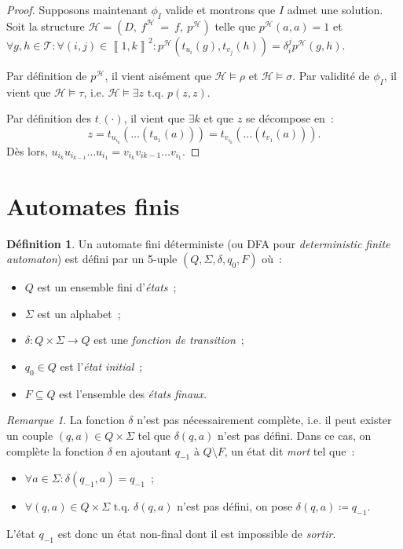 \documentclass{article}
\theoremstyle{definition}
\newtheorem{déf}[thm]{Définition}
\theoremstyle{remark}
\newtheorem*{rmq}{Remarque}
\newcommand{\intint}[2]{\left\llbracket#1, #2\right\rrbracket}
\newcommand{\tq}{\text{ t.q. }}
\begin{document}
\begin{proof}
		Supposons maintenant $\phi_I$ valide et montrons que $I$ admet une solution. Soit la structure $\mathcal H = (D,~f^{\mathcal H}~=~f,~p^{\mathcal H})$
		telle que $p^{\mathcal H}(a, a)=1$ et
		$\forall g, h \in \mathcal T : \forall (i, j) \in \intint 1k^2 : p^{\mathcal H}(t_{u_i}(g), t_{v_j}(h)) = \delta_i^jp^{\mathcal H}(g, h)$.

		Par définition de $p^{\mathcal H}$, il vient aisément que $\mathcal H \models \rho$ et $\mathcal H \models \sigma$. Par validité de $\phi_I$, il vient
		que $\mathcal H \models \tau$, i.e. $\mathcal H \models \exists z \tq p(z, z)$.

		Par définition des $t_{\cdot}(\cdot)$, il vient que $\exists k$ et que $z$ se décompose en~:
		\[z = t_{u_{i_k}}(\ldots(t_{u_1}(a))) = t_{v_{i_k}}(\ldots(t_{v_1}(a))).\]
		Dès lors, $u_{i_k}u_{i_{k-1}}\ldots u_{i_1} = v_{i_k}v_{i{k-1}}\ldots v_{i_1}.$
		\end{proof}

\section{Automates finis}
	\begin{déf} Un automate fini déterministe (ou DFA pour \textit{deterministic finite automaton}) est défini par un 5-uple $(Q, \Sigma, \delta, q_0, F)$ où~:
	\begin{itemize}
		\item $Q$ est un ensemble fini d'\textit{états}~;
		\item $\Sigma$ est un alphabet~;
		\item $\delta : Q \times \Sigma \to Q$ est une \textit{fonction de transition}~;
		\item $q_0 \in Q$ est l'\textit{état initial}~;
		\item $F \subseteq Q$ est l'ensemble des \textit{états finaux}.
	\end{itemize}
	\end{déf}

	\begin{rmq} La fonction $\delta$ n'est pas nécessairement complète, i.e. il peut exister un couple $(q, a) \in Q \times \Sigma$ tel que $\delta(q, a)$ n'est
	pas défini. Dans ce cas, on complète la fonction $\delta$ en ajoutant $q_{-1}$ à $Q \setminus F$, un état dit \textit{mort} tel que~:
	\begin{itemize}
		\item $\forall a \in \Sigma : \delta(q_{-1}, a) = q_{-1}$~;
		\item $\forall (q, a) \in Q \times \Sigma \tq \delta(q, a)$ n'est pas défini, on pose $\delta(q, a) \coloneqq q_{-1}$.
	\end{itemize}

	L'état $q_{-1}$ est donc un état non-final dont il est impossible de \textit{sortir}.
	\end{rmq}
\end{document}
